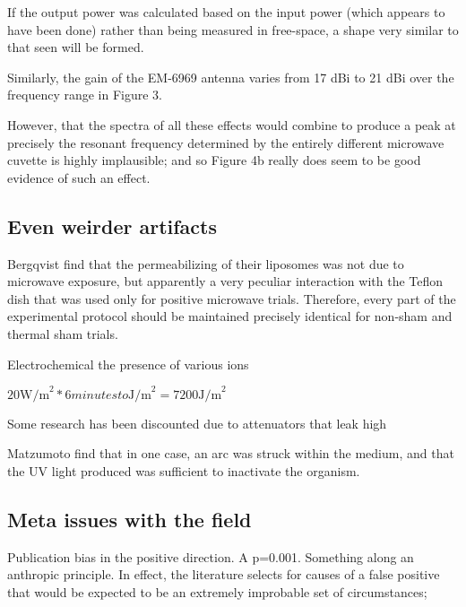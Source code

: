 \documentclass[paper.tex]{subfiles}
\begin{document}
\begin{multicols}{1}
If the output power was calculated based on the input power (which appears to have been done) rather than being measured in free-space, a shape very similar to that seen will be formed.

Similarly, the gain of the EM-6969 antenna\cite{EM6969} varies from 17 dBi to 21 dBi over the frequency range in Figure 3.

However, that the spectra of all these effects would combine to produce a peak at precisely the resonant frequency determined by the entirely different microwave cuvette is highly implausible; and so Figure 4b really does seem to be good evidence of such an effect.


\subsection{Even weirder artifacts}

Bergqvist \cite{Effect1994a} find that the permeabilizing of their liposomes was not due to microwave exposure, but apparently a very peculiar interaction with the Teflon dish that was used only for positive microwave trials. Therefore, every part of the experimental protocol should be maintained precisely identical for non-sham and thermal sham trials.

Electrochemical the presence of various ions 



$20 \text{W/m}^2 * 6 minutes to \text{J/m}^2 = 7200 \text{J/m}^2$


Some research has been discounted due to attenuators that leak high 

Matzumoto \cite{Inactivation1991} find that in one case, an arc was struck within the medium, and that the UV light produced was sufficient to inactivate the organism.





\subsection{Meta issues with the field}


Publication bias in the positive direction. A p=0.001. Something along an anthropic principle. In effect, the literature selects for causes of a false positive that would be expected to be an extremely improbable set of circumstances; 


\end{multicols}
\end{document}

